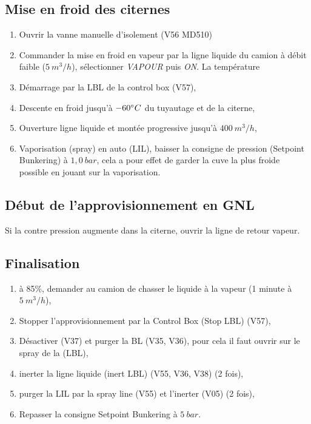 \documentclass[12pt,a4paper]{article}
\begin{document}
\subsection*{Mise en froid des citernes}

\begin{enumerate}[resume]
 \item Ouvrir la vanne manuelle d'isolement (V56 MD510)
 \item Commander la mise en froid en vapeur par la ligne liquide du camion à débit faible ($5~m^3/h $), sélectionner \emph{VAPOUR} puis \emph{ON}. La température 
 \item Démarrage par la LBL de la control box (V57),
 \item Descente en froid jusqu'à $-60 \degree C$ du tuyautage et de la citerne,
 \item Ouverture ligne liquide et montée progressive jusqu'à $400~m^3/h$,
 \item Vaporisation (spray) en auto (LIL), baisser la consigne de pression (Setpoint Bunkering) à $1,0~bar$, cela a pour effet de garder la cuve la plus froide possible en jouant sur la vaporisation. 
\end{enumerate}
\subsection*{Début de l'approvisionnement en GNL}
Si la contre pression augmente dans la citerne, ouvrir la ligne de retour vapeur. 

\subsection*{Finalisation}
\begin{enumerate}
 \item à 85\%, demander au camion de chasser le liquide à la vapeur (1 minute à $5~m^3/h$),
 \item Stopper l'approvisionnement par la Control Box (Stop LBL) (V57),
 \item Désactiver (V37) et purger la BL (V35, V36), pour cela il faut ouvrir sur le spray de la (LBL),
 \item inerter la ligne liquide (inert LBL) (V55, V36, V38) (2 fois),
 \item purger la LIL par la spray line (V55) et l'inerter (V05) (2 fois),
 \item Repasser la consigne Setpoint Bunkering à $5~bar$.
\end{enumerate}
\end{document}
